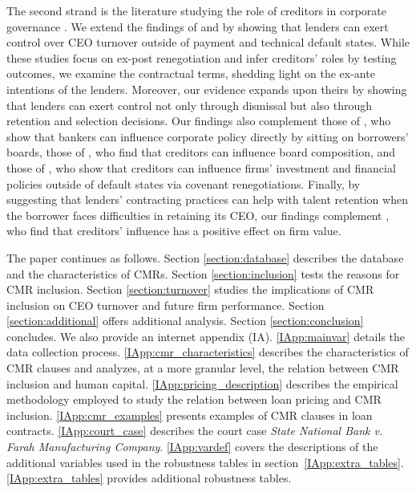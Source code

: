 \documentclass[a4paper,12pt]{article}
\begin{document}
The second strand is the literature studying the role of creditors in corporate governance \citep{Shleifer_1997, Roberts_2009b}.
We extend the findings of \cite{Gilson_1989} and \cite{Nini_2012} by showing that lenders can exert control over CEO turnover outside of payment and technical default states.
While these studies focus on ex-post renegotiation and infer creditors' roles by testing outcomes, we examine the contractual terms, shedding light on the ex-ante intentions of the lenders.
Moreover, our evidence expands upon theirs by showing that lenders can exert control not only through dismissal but also through retention and selection decisions.
Our findings also complement those of \cite{Kroszner_2001}, who show that bankers can influence corporate policy directly by sitting on borrowers' boards, those of \cite{ferreira_2018}, who find that creditors can influence board composition, and those of \cite{Denis_2014}, who show that creditors can influence firms' investment and financial policies outside of default states via covenant renegotiations.
Finally, by suggesting that lenders' contracting practices can help with talent retention when the borrower faces difficulties in retaining its CEO, our findings complement \cite{Nini_2012}, who find that creditors' influence has a positive effect on firm value.



The paper continues as follows.
Section \ref{section:database} describes the database and the characteristics of CMRs.
Section \ref{section:inclusion} tests the reasons for CMR inclusion.
Section \ref{section:turnover} studies the implications of CMR inclusion on CEO turnover and future firm performance.
Section \ref{section:additional} offers additional analysis.
Section \ref{section:conclusion} concludes.
We also provide an internet appendix (IA).
\ref{IApp:mainvar} details the data collection process.
\ref{IApp:cmr_characteristics} describes the characteristics of CMR clauses and analyzes, at a more granular level, the relation between CMR inclusion and human capital.
\ref{IApp:pricing_description} describes the empirical methodology employed to study the relation between loan pricing and CMR inclusion.
\ref{IApp:cmr_examples} presents examples of CMR clauses in loan contracts.
\ref{IApp:court_case} describes the court case \textit{State National Bank v. Farah Manufacturing Company}.
\ref{IApp:vardef} covers the descriptions of the additional variables used in the robustness tables in section~\ref{IApp:extra_tables}.
\ref{IApp:extra_tables} provides additional robustness tables.
\end{document}
